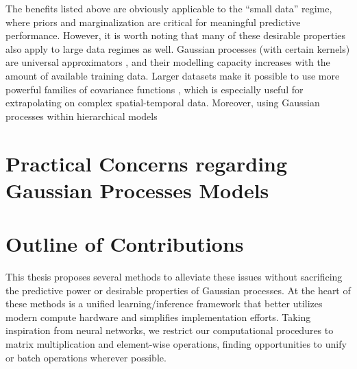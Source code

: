 The benefits listed above are obviously applicable to the ``small data'' regime, where priors and marginalization are critical for meaningful predictive performance.
However, it is worth noting that many of these desirable properties also apply to large data regimes as well.
Gaussian processes (with certain kernels) are universal approximators \cite{micchelli2006universal}, and their modelling capacity increases with the amount of available training data.
Larger datasets make it possible to use more powerful families of covariance functions \citep{wilson2013gaussian,wilson2016deep,benton2019function}, which is especially useful for extrapolating on complex spatial-temporal data.
Moreover, using Gaussian processes within hierarchical models \cite{wilson2016deep,salimbeni2017doubly,jankowiak2020deep}

\section{Practical Concerns regarding Gaussian Processes Models}

\section{Outline of Contributions}

This thesis proposes several methods to alleviate these issues without sacrificing the predictive power or desirable properties of Gaussian processes.
At the heart of these methods is a unified learning/inference framework that better utilizes modern compute hardware and simplifies implementation efforts.
Taking inspiration from neural networks, we restrict our computational procedures to matrix multiplication and element-wise operations, finding opportunities to unify or batch operations wherever possible.



